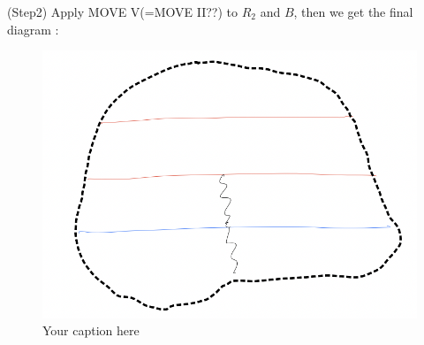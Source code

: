(Step2) Apply MOVE \RN{5}(=MOVE \RN{2}??) to $R_2$ and $B$, then we get the final diagram :

\begin{figure}[H] %
    \centering
    \includegraphics[width=\linewidth]{diagrams/definition8/3.png} %
    \caption{Your caption here}
    \label{fig:your-label}
\end{figure}